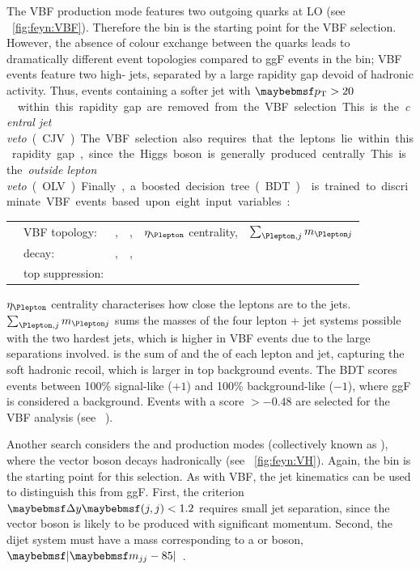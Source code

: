 The VBF production mode features two outgoing quarks at LO (see 
\Figure~\ref{fig:feyn:VBF}). 
Therefore the \twojet bin is the starting point for the VBF selection. However, the 
absence of colour exchange between the quarks leads to dramatically different event 
topologies compared to ggF events in the \twojet bin; VBF events feature two high-\pt 
jets, separated by a large rapidity gap devoid of hadronic activity. Thus, events 
containing a softer jet with \unit{$\pt > 20$}{\GeV} within this rapidity gap are removed 
from the VBF selection. This is the \textit{central jet veto} (CJV). The VBF selection 
also requires that the leptons lie within this rapidity gap, since the Higgs boson is 
generally produced centrally. This is the \textit{outside lepton veto} (OLV). Finally, a 
boosted decision tree (BDT) \cite{TMVA} is trained to discriminate VBF events based upon 
eight input variables:

\begin{listliketab}
	\begin{tabular}{Ll@{\hskip 0.3in}llll}
		\textbullet & VBF topology:    & \mjj, &\dyjj, &$\eta_{\Plepton}$ centrality, &$\sum_{\Plepton, j} m_{\Plepton j}$ \\
		\textbullet & \HWW decay:      & \mll, &\dphill, &\mt \\
		\textbullet & top suppression: & \pttot \\
	\end{tabular}
\end{listliketab}

\noindent
$\eta_{\Plepton}$ centrality characterises how close the leptons are to the jets. 
$\sum_{\Plepton, j} m_{\Plepton j}$ sums the masses of the four lepton + jet systems 
possible with the two hardest jets, which is higher in VBF events due to the large 
separations involved. \pttot is the sum of \corrtrackmetvec and the \ptvec of each lepton 
and jet, capturing the soft hadronic recoil, which is larger in top background events. 
The BDT scores events between 100\% signal-like ($+1$) and 100\% background-like ($-1$), 
where ggF is considered a background. Events with a score $> -0.48$ are selected for the 
VBF analysis (see \Figure~).

Another search considers the \WH and \ZH production modes (collectively known as \VH), 
where the vector boson decays hadronically (see \Figure~\ref{fig:feyn:VH}). Again, the 
\twojet bin is the starting point for this selection. As with VBF, the jet kinematics can 
be used to distinguish this from ggF. First, the criterion $\dyjj < 1.2$ requires small 
jet separation, since the vector boson is likely to be produced with significant momentum.
Second, the dijet system must have a mass corresponding to a \PW or \PZ boson, 
\unit{$\mods{\mjj - 85}$}{\GeV}.

